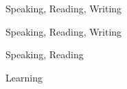 
	Speaking, Reading, Writing\\
	\divider

	Speaking, Reading, Writing\\
	\divider

	Speaking, Reading\\
	\divider

	Learning\\

	\medskip